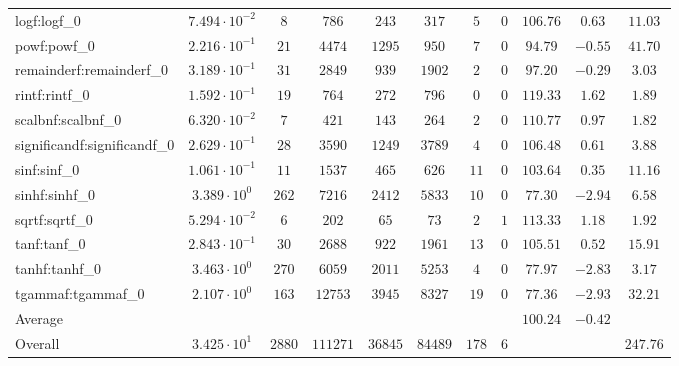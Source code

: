 \begin{tabular}{|l|c|c|c|c|c|c|c|c|c|c|}
logf:logf\_0                 & $ 7.494 \cdot 10^{-2} $ & $ 8      $ & $ 786    $ & $ 243   $ & $ 317   $ & $ 5   $ & $ 0 $ & $ 106.76      $ & $ 0.63    $ & $ 11.03   $ \\
powf:powf\_0                 & $ 2.216 \cdot 10^{-1} $ & $ 21     $ & $ 4474   $ & $ 1295  $ & $ 950   $ & $ 7   $ & $ 0 $ & $ 94.79       $ & $ -0.55   $ & $ 41.70   $ \\
remainderf:remainderf\_0     & $ 3.189 \cdot 10^{-1} $ & $ 31     $ & $ 2849   $ & $ 939   $ & $ 1902  $ & $ 2   $ & $ 0 $ & $ 97.20       $ & $ -0.29   $ & $ 3.03    $ \\
rintf:rintf\_0               & $ 1.592 \cdot 10^{-1} $ & $ 19     $ & $ 764    $ & $ 272   $ & $ 796   $ & $ 0   $ & $ 0 $ & $ 119.33      $ & $ 1.62    $ & $ 1.89    $ \\
scalbnf:scalbnf\_0           & $ 6.320 \cdot 10^{-2} $ & $ 7      $ & $ 421    $ & $ 143   $ & $ 264   $ & $ 2   $ & $ 0 $ & $ 110.77      $ & $ 0.97    $ & $ 1.82    $ \\
significandf:significandf\_0 & $ 2.629 \cdot 10^{-1} $ & $ 28     $ & $ 3590   $ & $ 1249  $ & $ 3789  $ & $ 4   $ & $ 0 $ & $ 106.48      $ & $ 0.61    $ & $ 3.88    $ \\
sinf:sinf\_0                 & $ 1.061 \cdot 10^{-1} $ & $ 11     $ & $ 1537   $ & $ 465   $ & $ 626   $ & $ 11  $ & $ 0 $ & $ 103.64      $ & $ 0.35    $ & $ 11.16   $ \\
sinhf:sinhf\_0               & $ 3.389 \cdot 10^{0}  $ & $ 262    $ & $ 7216   $ & $ 2412  $ & $ 5833  $ & $ 10  $ & $ 0 $ & $ 77.30       $ & $ -2.94   $ & $ 6.58    $ \\
sqrtf:sqrtf\_0               & $ 5.294 \cdot 10^{-2} $ & $ 6      $ & $ 202    $ & $ 65    $ & $ 73    $ & $ 2   $ & $ 1 $ & $ 113.33      $ & $ 1.18    $ & $ 1.92    $ \\
tanf:tanf\_0                 & $ 2.843 \cdot 10^{-1} $ & $ 30     $ & $ 2688   $ & $ 922   $ & $ 1961  $ & $ 13  $ & $ 0 $ & $ 105.51      $ & $ 0.52    $ & $ 15.91   $ \\
tanhf:tanhf\_0               & $ 3.463 \cdot 10^{0}  $ & $ 270    $ & $ 6059   $ & $ 2011  $ & $ 5253  $ & $ 4   $ & $ 0 $ & $ 77.97       $ & $ -2.83   $ & $ 3.17    $ \\
tgammaf:tgammaf\_0           & $ 2.107 \cdot 10^{0}  $ & $ 163    $ & $ 12753  $ & $ 3945  $ & $ 8327  $ & $ 19  $ & $ 0 $ & $ 77.36       $ & $ -2.93   $ & $ 32.21   $ \\
\hline
Average                      & $                     $ & $        $ & $        $ & $       $ & $       $ & $     $ & $   $ & $ 100.24      $ & $ -0.42   $ & $         $ \\
\hline
Overall                      & $ 3.425 \cdot 10^{1}  $ & $ 2880   $ & $ 111271 $ & $ 36845 $ & $ 84489 $ & $ 178 $ & $ 6 $ & $             $ & $         $ & $ 247.76  $ \\
\hline
\end{tabular}
